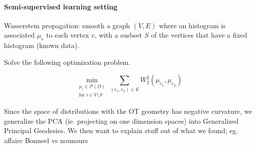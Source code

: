 
\paragraph{Semi-supervised learning setting}

Wasserstein propagation: smooth a graph $(V,E)$ where an histogram is associated
$\mu_v$ to each vertex $v$, with a susbset $S$ of the vertices that have a
fixed histogram (known data).

Solve the following optimization problem.

$$
    \underset{\substack{\mu_i \in \mathcal{P}\left(\Omega\right) \\ \text{for }i \in V\setminus S}}\min \sum_{(e_1, e_2) \in E} W_2^2\left(\mu_{e_1}, \mu_{e_2}\right)
$$


Since the space of distributions with the OT geometry has negative curvature,
we generalize the PCA (ie. projecting on one dimension spaces) into Generalized
Principal Geodesics. We then want to explain stuff out of what we found;
eg. affaire Bonneel vs nounours
